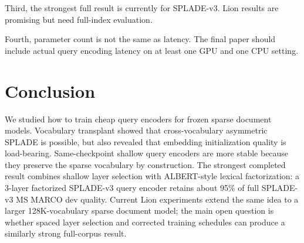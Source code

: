 \documentclass[
]{ceurart}
\begin{document}
Third, the strongest full result is currently for SPLADE-v3. Lion results are
promising but need full-index evaluation.

Fourth, parameter count is not the same as latency. The final paper should
include actual query encoding latency on at least one GPU and one CPU setting.

\section{Conclusion}

We studied how to train cheap query encoders for frozen sparse document models.
Vocabulary transplant showed that cross-vocabulary asymmetric SPLADE is
possible, but also revealed that embedding initialization quality is
load-bearing. Same-checkpoint shallow query encoders are more stable because
they preserve the sparse vocabulary by construction. The strongest completed
result combines shallow layer selection with ALBERT-style lexical factorization:
a 3-layer factorized SPLADE-v3 query encoder retains about 95\% of full
SPLADE-v3 MS MARCO dev quality. Current Lion experiments extend the same idea
to a larger 128K-vocabulary sparse document model; the main open question is
whether spaced layer selection and corrected training schedules can produce a
similarly strong full-corpus result.
\end{document}
